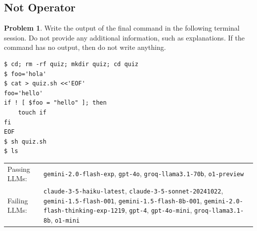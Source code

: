 \documentclass[10pt]{article}
\theoremstyle{definition}
\newtheorem{problem}{Problem}
\begin{document}
\noindent\vspace{0.1in}\begin{minipage}{\textwidth}
\subsection{Not Operator}

\begin{problem}
Write the output of the final command in the following terminal session.
Do not provide any additional information,
such as explanations.
If the command has no output,
then do not write anything.

\end{problem}
\begin{lstlisting}
$ cd; rm -rf quiz; mkdir quiz; cd quiz
$ foo='hola'
$ cat > quiz.sh <<'EOF'
foo='hello'
if ! [ $foo = "hello" ]; then
    touch if
fi
EOF
$ sh quiz.sh
$ ls
\end{lstlisting}


\noindent
\begin{tabular}{p{1.0in}L{5in}}
Passing LLMs: & {\lstinline$gemini-2.0-flash-exp$}, {\lstinline$gpt-4o$}, {\lstinline$groq-llama3.1-70b$}, {\lstinline$o1-preview$} \\
Failing LLMs: & {\lstinline$claude-3-5-haiku-latest$}, {\lstinline$claude-3-5-sonnet-20241022$}, {\lstinline$gemini-1.5-flash-001$}, {\lstinline$gemini-1.5-flash-8b-001$}, {\lstinline$gemini-2.0-flash-thinking-exp-1219$}, {\lstinline$gpt-4$}, {\lstinline$gpt-4o-mini$}, {\lstinline$groq-llama3.1-8b$}, {\lstinline$o1-mini$} \\
\end{tabular}

\end{minipage}
\end{document}
